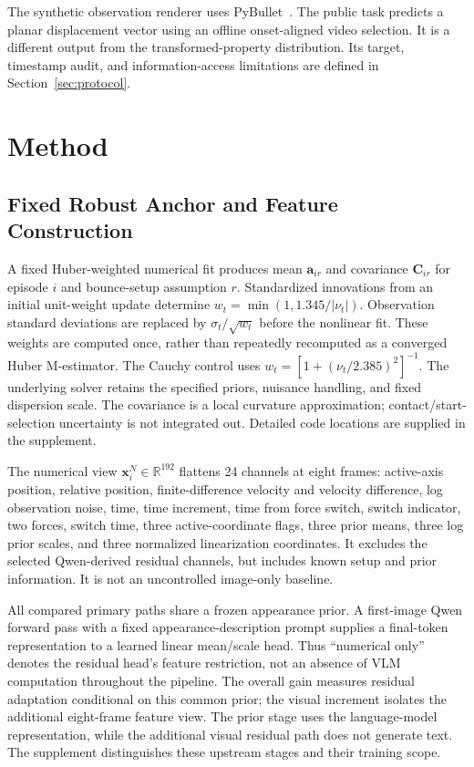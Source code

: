 \documentclass{ieeeaccess}
\begin{document}
The synthetic observation renderer uses PyBullet~\cite{coumans2022pybullet}. The public task predicts a planar displacement vector using an offline onset-aligned video selection. It is a different output from the transformed-property distribution. Its target, timestamp audit, and information-access limitations are defined in Section~\ref{sec:protocol}.

\section{Method}\label{sec:method}
\subsection{Fixed Robust Anchor and Feature Construction}
A fixed Huber-weighted numerical fit produces mean $\bm a_{ir}$ and covariance $\bm C_{ir}$ for episode $i$ and bounce-setup assumption $r$. Standardized innovations from an initial unit-weight update determine $w_t=\min(1,1.345/|\nu_t|)$. Observation standard deviations are replaced by $\sigma_t/\sqrt{w_t}$ before the nonlinear fit. These weights are computed once, rather than repeatedly recomputed as a converged Huber M-estimator. The Cauchy control uses $w_t=[1+(\nu_t/2.385)^2]^{-1}$. The underlying solver retains the specified priors, nuisance handling, and fixed dispersion scale. The covariance is a local curvature approximation; contact/start-selection uncertainty is not integrated out. Detailed code locations are supplied in the supplement.

The numerical view $\bm x_i^N\in\mathbb R^{192}$ flattens 24 channels at eight frames: active-axis position, relative position, finite-difference velocity and velocity difference, log observation noise, time, time increment, time from force switch, switch indicator, two forces, switch time, three active-coordinate flags, three prior means, three log prior scales, and three normalized linearization coordinates. It excludes the selected Qwen-derived residual channels, but includes known setup and prior information. It is not an uncontrolled image-only baseline.

All compared primary paths share a frozen appearance prior. A first-image Qwen forward pass with a fixed appearance-description prompt supplies a final-token representation to a learned linear mean/scale head. Thus ``numerical only'' denotes the residual head's feature restriction, not an absence of VLM computation throughout the pipeline. The overall gain measures residual adaptation conditional on this common prior; the visual increment isolates the additional eight-frame feature view. The prior stage uses the language-model representation, while the additional visual residual path does not generate text. The supplement distinguishes these upstream stages and their training scope.
\end{document}
